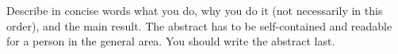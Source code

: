 Describe in concise words what you do, why you do it (not necessarily in this order), and the main result.  The abstract has to be self-contained and readable for a person in the general area. You should write the abstract last.